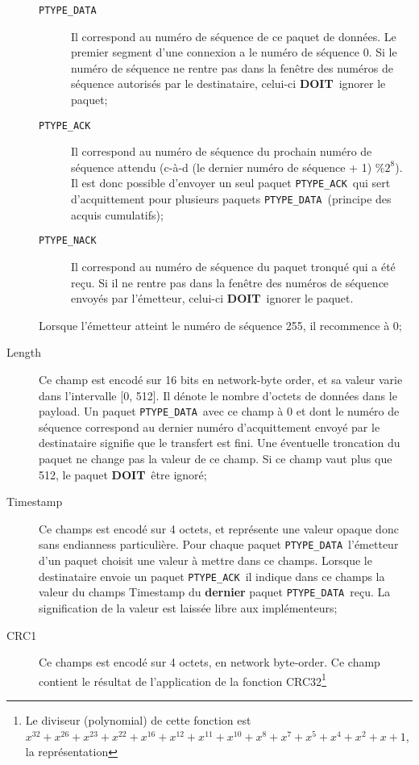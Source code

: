 \documentclass[a4paper,12pt]{article}
\newcommand{\must}{\textbf{DOIT}}
\newcommand{\pdata}{\texttt{PTYPE\_DATA}}
\newcommand{\pack}{\texttt{PTYPE\_ACK}}
\newcommand{\pnack}{\texttt{PTYPE\_NACK}}
\begin{document}
\begin{description}
\begin{description}
            \item[\pdata] Il correspond au numéro de séquence de ce paquet de données.
                Le premier segment d'une connexion a le numéro de séquence 0. Si le numéro
                de séquence ne rentre pas dans la fenêtre des numéros de séquence autorisés
                par le destinataire, celui-ci \must\ ignorer le paquet;
            \item[\pack] Il correspond au numéro de séquence du prochain numéro de séquence
                attendu (c-à-d (le dernier numéro de séquence + 1) $\% 2^8$).
                Il est donc possible d'envoyer un seul paquet \pack\ qui sert d'acquittement
                pour plusieurs paquets \pdata\ (principe des acquis
                cumulatifs);
            \item[\pnack] Il correspond au numéro de séquence du paquet tronqué qui a été reçu. Si il ne rentre pas dans la fenêtre des numéros de séquence envoyés par l'émetteur, celui-ci \must\ ignorer le paquet.
        \end{description}
        Lorsque l'émetteur atteint le numéro de séquence 255, il recommence à 0;
    \item[Length] Ce champ est encodé sur 16 bits en network-byte order, et sa
        valeur varie dans l'intervalle [0, 512].
        Il dénote le nombre d'octets de données dans le payload.
        Un paquet \pdata\ avec ce champ à 0 et dont le numéro de séquence correspond
        au dernier numéro d'acquittement envoyé par le destinataire signifie que le transfert est
        fini. Une éventuelle troncation du paquet ne change pas la valeur de ce champ. Si ce champ 
        vaut plus que 512, le paquet \must\ être ignoré;
    \item[Timestamp] Ce champs est encodé sur 4 octets, et représente une
        valeur opaque donc sans endianness particulière. Pour chaque paquet
        \pdata\, l'émetteur d'un paquet choisit une valeur à mettre dans ce
        champs. Lorsque le destinataire envoie un paquet \pack\, il indique
        dans ce champs la valeur du champs Timestamp du \textbf{dernier} paquet
        \pdata\ reçu. La signification de la valeur est laissée libre aux
        implémenteurs;
    \item[CRC1] Ce champs est encodé sur 4 octets, en network byte-order.
    Ce champ contient le résultat de l'application de la fonction
    CRC32\footnote{Le diviseur (polynomial) de cette fonction est
    	$x^{32} + x^{26} + x^{23} + x^{22} + x^{16} + x^{12} + x^{11} + x^{10} + x^8 + x^7 + x^5 + x^4 + x^2 + x + 1$, la représentation
}
\end{description}
\end{document}
